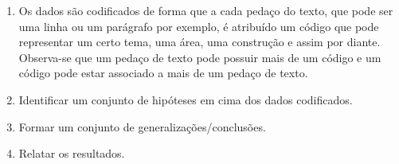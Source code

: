\begin{enumerate}
	\item Os dados são codificados de forma que a cada pedaço do texto, que pode ser uma linha ou um parágrafo por exemplo, é atribuído um código que pode representar um certo tema, uma área, uma construção e assim por diante. Observa-se que um pedaço de texto pode possuir mais de um código e um código pode estar associado a mais de um pedaço de texto.
	\item Identificar um conjunto de hipóteses em cima dos dados codificados.
	\item Formar um conjunto de generalizações/conclusões.
	\item Relatar os resultados.
\end{enumerate}

